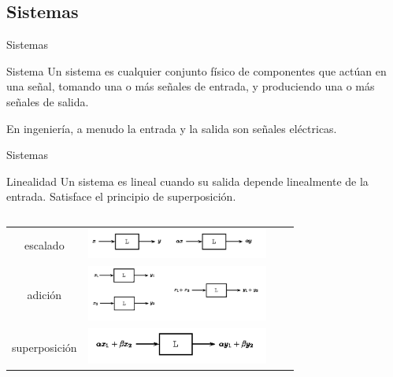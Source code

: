  \subsection{Sistemas}
 \begin{frame}{Sistemas}
    \begin{block}{Sistema}
       Un sistema es cualquier conjunto físico de componentes que actúan en una señal, tomando una o más señales de entrada, y produciendo una o más señales de salida.
    \end{block}
    En ingeniería, a menudo la entrada y la salida son señales eléctricas.\\
    \vfill
 \end{frame}
 \begin{frame}{Sistemas}
    \begin{block}{Linealidad}
       Un sistema es lineal cuando su salida depende linealmente de la entrada.
       Satisface el principio de superposición.
    \end{block}
    \begin{columns}[onlytextwidth]
       \begin{centering}
          \begin{table}[h]
             \begin{tabular}{cm{6cm}cm{6cm}}
                escalado      & \includegraphics[width=6cm]{1_clase/superposicion1}\\
                adición       & \includegraphics[width=6cm]{1_clase/superposicion2}\\
                superposición & \includegraphics[width=6cm]{1_clase/superposicion3}\\
             \end{tabular}
          \end{table}
       \end{centering}
    \end{columns}
    \vfill
 \end{frame}

